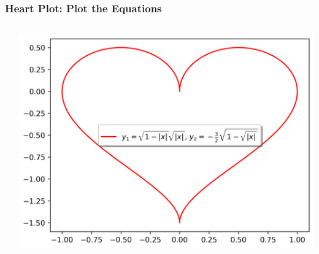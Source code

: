 \documentclass[xcolor={svgnames}]{beamer}
\newcommand{\pyfile}[2][]{}
\begin{document}
\begin{frame}[t,fragile]
    \frametitle{Heart Plot: Plot the Equations}
    \vspace{-2mm}
    \begin{columns}[T]
        \begin{column}{0.47\textwidth}
            \pyfile[style=tiny,linerange={1-18}]{examples/heart-0.py}
        \end{column}
        \begin{column}{0.53\textwidth}
            \includegraphics[width=\textwidth]{img/heart-0.png}
        \end{column}
    \end{columns}
\end{frame}
\end{document}
